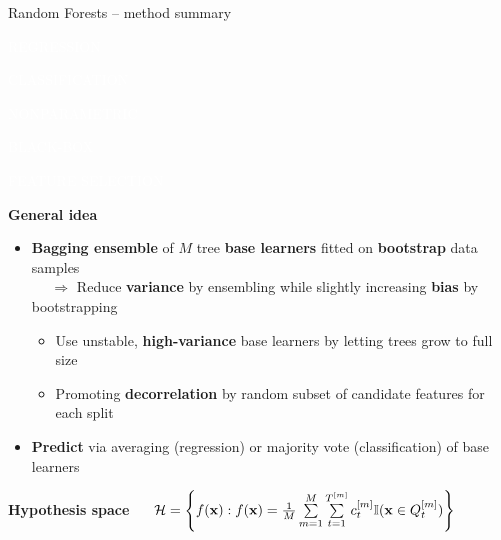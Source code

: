 \documentclass[11pt,compress,t,notes=noshow, xcolor=table]{beamer}
\newcommand{\highlight}[1]{\textcolor{hlcol}{\textbf{#1}}}
\newcommand{\maketag}[2][100]{
  \colorbox{hlcol!#1}{\textcolor{white}{\MakeUppercase{\scriptsize #2}} 
  \vphantom{}}
}
\begin{document}
\begin{frame2}{Random Forests -- method summary}

\maketag{regression} \maketag{classification}
\maketag{NONPARAMETRIC} \maketag[50]{BLACK-BOX} \maketag{FEATURE SELECTION}


\highlight{General idea} 
\begin{itemize}
  \item \textbf{Bagging ensemble} of $M$ tree \textbf{base learners} fitted on \textbf{bootstrap} data samples\\
   ~~ $\Rightarrow$ Reduce \textbf{variance} by ensembling while slightly increasing \textbf{bias} by bootstrapping  
   \begin{itemize}
    \item Use unstable, \textbf{high-variance} base learners by letting trees grow to full size
    \item Promoting \textbf{decorrelation} by random subset of candidate features for each split
  \end{itemize}
  \item \textbf{Predict} via averaging (regression) or majority vote (classification) of base learners
\end{itemize}

\medskip

\highlight{Hypothesis space} ~~
$\mathcal{H} = \left\{ f(\mathbf{x}): f(\mathbf{x}) = \frac{1}{M} \sum\limits_{m = 1}^M 
\sum\limits_{t = 1}^{T^{[m]}} 
c_t^{[m]} \mathbb{I}(\mathbf{x} \in Q_t^{[m]}) \right\}$

\end{frame2}
\end{document}

